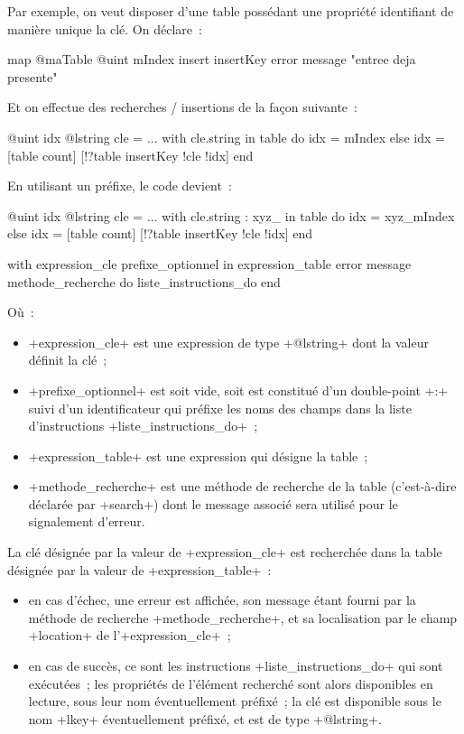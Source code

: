 Par exemple, on veut disposer d'une table possédant une propriété identifiant de manière unique la clé. On déclare~:
\begin{galgas}
map @maTable {
  @uint mIndex
  insert insertKey error message "entree deja presente"
}
\end{galgas}

Et on effectue des recherches / insertions de la façon suivante~:
\begin{galgas}
@uint idx
@lstring cle = ...
with cle.string in table do
  idx = mIndex
else
  idx = [table count]
  [!?table insertKey !cle !idx]
end
\end{galgas}

En utilisant un préfixe, le code devient~:
\begin{galgas}
@uint idx
@lstring cle = ...
with cle.string : xyz_ in table do
  idx = xyz_mIndex
else
  idx = [table count]
  [!?table insertKey !cle !idx]
end
\end{galgas}






\begin{galgas}
with expression_cle prefixe_optionnel in expression_table
error message methode_recherche
do
  liste_instructions_do
end
\end{galgas}

Où~:
\begin{itemize}
  \item \ggs+expression_cle+ est une expression de type \ggs+@lstring+ dont la valeur définit la clé~;
  \item \ggs+prefixe_optionnel+ est soit vide, soit est constitué d'un double-point \ggs+:+ suivi d'un identificateur qui préfixe les noms des champs dans la liste d'instructions \ggs+liste_instructions_do+~;
  \item \ggs+expression_table+ est une expression qui désigne la table~;
  \item \ggs+methode_recherche+ est une méthode de recherche de la table (c'est-à-dire déclarée par \ggs+search+) dont le message associé sera utilisé pour le signalement d'erreur.
\end{itemize}

La clé désignée par la valeur de \ggs+expression_cle+ est recherchée dans la table désignée par la valeur de \ggs+expression_table+~:
\begin{itemize}
  \item en cas d'échec, une erreur est affichée, son message étant fourni par la méthode de recherche \ggs+methode_recherche+, et sa localisation par le champ \ggs+location+ de l'\ggs+expression_cle+~;
  \item en cas de succès, ce sont les instructions \ggs+liste_instructions_do+ qui sont exécutées~; les propriétés de l'élément recherché sont alors disponibles en lecture, sous leur nom éventuellement préfixé~; la clé est disponible sous le nom \ggs+lkey+ éventuellement préfixé, et est de type \ggs+@lstring+.
\end{itemize}

